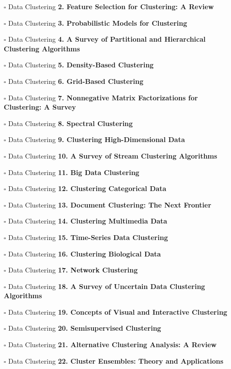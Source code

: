 \documentclass[a4, landscape, 12pt]{article}
\newcommand{\checkbox}{$\square$}%
\begin{document}
\begin{itemize}
{}
\item [\checkbox]  Data Clustering \textbf{ 2. Feature Selection for Clustering: A Review
}
\item [\checkbox]  Data Clustering \textbf{ 3. Probabilistic Models for Clustering
}
\item [\checkbox]  Data Clustering \textbf{ 4. A Survey of Partitional and Hierarchical Clustering Algorithms
}
\item [\checkbox]  Data Clustering \textbf{ 5. Density-Based Clustering
}
\item [\checkbox]  Data Clustering \textbf{ 6. Grid-Based Clustering
}
\item [\checkbox]  Data Clustering \textbf{ 7. Nonnegative Matrix Factorizations for Clustering: A Survey
}
\item [\checkbox]  Data Clustering \textbf{ 8. Spectral Clustering
}
\item [\checkbox]  Data Clustering \textbf{ 9. Clustering High-Dimensional Data
}
\item [\checkbox]  Data Clustering \textbf{ 10. A Survey of Stream Clustering Algorithms
}
\item [\checkbox]  Data Clustering \textbf{ 11. Big Data Clustering
}
\item [\checkbox]  Data Clustering \textbf{ 12. Clustering Categorical Data
}
\item [\checkbox]  Data Clustering \textbf{ 13. Document Clustering: The Next Frontier
}
\item [\checkbox]  Data Clustering \textbf{ 14. Clustering Multimedia Data
}
\item [\checkbox]  Data Clustering \textbf{ 15. Time-Series Data Clustering
}
\item [\checkbox]  Data Clustering \textbf{ 16. Clustering Biological Data
}
\item [\checkbox]  Data Clustering \textbf{ 17. Network Clustering
}
\item [\checkbox]  Data Clustering \textbf{ 18. A Survey of Uncertain Data Clustering Algorithms
}
\item [\checkbox]  Data Clustering \textbf{ 19. Concepts of Visual and Interactive Clustering
}
\item [\checkbox]  Data Clustering \textbf{ 20. Semisupervised Clustering
}
\item [\checkbox]  Data Clustering \textbf{ 21. Alternative Clustering Analysis: A Review
}
\item [\checkbox]  Data Clustering \textbf{ 22. Cluster Ensembles: Theory and Applications
}
\end{itemize}
\end{document}
